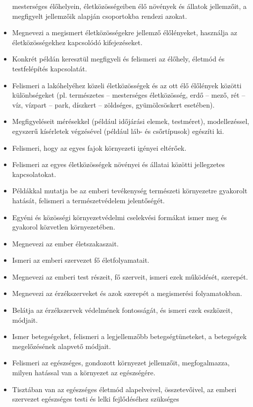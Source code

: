 \begin{itemize}
  mesterséges élőhelyein, életközösségeiben élő növények és állatok
  jellemzőit, a megfigyelt jellemzőik alapján csoportokba rendezi
  azokat.
\item
  Megnevezi a megismert életközösségekre jellemző élőlényeket, használja
  az életközösségekhez kapcsolódó kifejezéseket.
\item
  Konkrét példán keresztül megfigyeli és felismeri az élőhely, életmód
  és testfelépítés kapcsolatát.
\item
  Felismeri a lakóhelyéhez közeli életközösségek és az ott élő élőlények
  közötti különbségeket (pl. természetes -- mesterséges életközösség,
  erdő -- mező, rét -- víz, vízpart -- park, díszkert -- zöldséges,
  gyümölcsöskert esetében).
\item
  Megfigyeléseit mérésekkel (például időjárási elemek, testméret),
  modellezéssel, egyszerű kísérletek végzésével (például láb- és
  csőrtípusok) egészíti ki.
\item
  Felismeri, hogy az egyes fajok környezeti igényei eltérőek.
\item
  Felismeri az egyes életközösségek növényei és állatai közötti
  jellegzetes kapcsolatokat.
\item
  Példákkal mutatja be az emberi tevékenység természeti környezetre
  gyakorolt hatását, felismeri a természetvédelem jelentőségét.
\item
  Egyéni és közösségi környezetvédelmi cselekvési formákat ismer meg és
  gyakorol közvetlen környezetében.
\item
  Megnevezi az ember életszakaszait.
\item
  Ismeri az emberi szervezet fő életfolyamatait.
\item
  Megnevezi az emberi test részeit, fő szerveit, ismeri ezek működését,
  szerepét.
\item
  Megnevezi az érzékszerveket és azok szerepét a megismerési
  folyamatokban.
\item
  Belátja az érzékszervek védelmének fontosságát, és ismeri ezek
  eszközeit, módjait.
\item
  Ismer betegségeket, felismeri a legjellemzőbb betegségtüneteket, a
  betegségek megelőzésének alapvető módjait.
\item
  Felismeri az egészséges, gondozott környezet jellemzőit,
  megfogalmazza, milyen hatással van a környezet az egészségére.
\item
  Tisztában van az egészséges életmód alapelveivel, összetevőivel, az
  emberi szervezet egészséges testi és lelki fejlődéséhez szükséges

\end{itemize}
